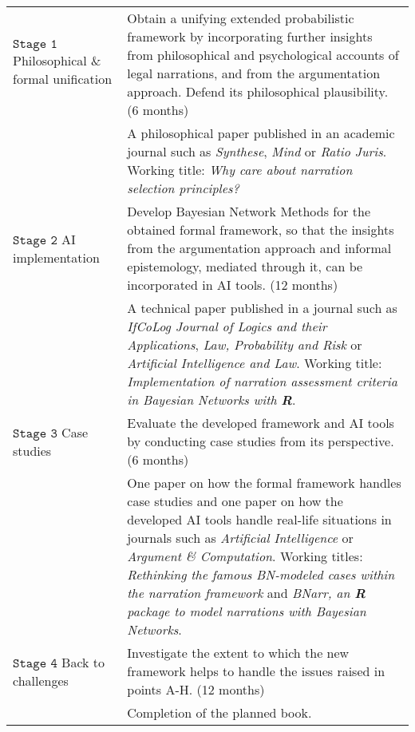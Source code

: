 \documentclass[11pt,dvipsnames,enabledeprecatedfontcommands]{scrartcl}
\begin{document}
\vspace{1mm}

\begin{center}
\begin{tabular}{p{1.6cm}|p{14.8cm}}
\footnotesize \textbf{$\mathtt{Stage  \,\, 1}$} \newline  \tiny Philosophical \&  formal   unification & 
Obtain a unifying extended  probabilistic framework by incorporating further insights  from philosophical and psychological accounts of legal narrations, and from the argumentation approach. Defend its philosophical plausibility. \scriptsize (6 months)
\\ 
& \footnotesize A philosophical paper published in an  academic journal such as \emph{Synthese}, \emph{Mind} or \emph{Ratio Juris}. Working title: \emph{Why care about narration selection principles?}\\ \hline
\footnotesize \textbf{$\mathtt{Stage \,\, 2}$} \newline  \tiny AI implementation 
 & Develop Bayesian Network Methods for the obtained formal framework, so that the insights from the argumentation approach and informal epistemology, mediated through it, can be incorporated in AI tools. \scriptsize (12 months)
\\ & \footnotesize A   technical paper  published in a journal such as \emph{IfCoLog Journal of Logics and their Applications}, \emph{Law, Probability and Risk} or \emph{Artificial Intelligence and Law}. Working title: \emph{Implementation of narration assessment criteria in Bayesian Networks with \textbf{\textsf{R}}}.
\\ \hline
\footnotesize \textbf{$\mathtt{Stage  \,\, 3}$} \newline  \tiny    Case studies & 
Evaluate the developed framework and AI tools  by conducting case studies from its perspective.    \scriptsize (6 months)  \\
& \footnotesize One paper  on  how the formal framework handles case studies and  one paper  on how the developed AI tools handle real-life situations in   journals such as \emph{Artificial Intelligence} or \emph{Argument \& Computation}. Working titles: \emph{Rethinking the famous BN-modeled cases within the narration framework} and \emph{BNarr, an \textbf{\textsf{R}} package to model narrations with Bayesian Networks}.
\\ \hline
\footnotesize \textbf{$\mathtt{Stage  \,\, 4}$} \newline  \tiny    Back to challenges  & 
Investigate the extent to which the new framework helps to handle the issues raised in points A-H. \scriptsize (12 months) \\ 
& \footnotesize Completion of the planned book.
\end{tabular}
\end{center}
\end{document}
